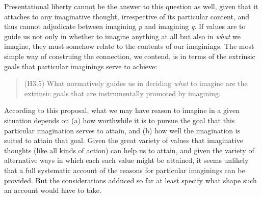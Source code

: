 \noindent Presentational liberty cannot be the answer to this question as well, given that it attaches to any imaginative thought, irrespective of its particular content, and thus cannot adjudicate between imagining \emph{p} and imagining \emph{q}. If values are to guide us not only in whether to imagine anything at all but also in \emph{what} we imagine, they must somehow relate to the contents of our imaginings. The most simple way of construing the connection, we contend, is in terms of the extrinsic goals that particular imaginings serve to achieve:

\vspace{-.2cm}
\begin{quote}
(H3.5) What normatively guides us in deciding \emph{what} to imagine are the extrinsic goals that are instrumentally promoted by imagining.
\end{quote}
\vspace{-.2cm}

\noindent According to this proposal, what we may have reason to imagine in a given situation depends on (a) how worthwhile it is to pursue the goal that this particular imagination serves to attain, and (b) how well the imagination is suited to attain that goal. Given the great variety of values that imaginative thoughts (like all kinds of action) can help us to attain, and given the variety of alternative ways in which each such value might be attained, it seems unlikely that a full systematic account of the reasons for particular imaginings can be provided. But the considerations adduced so far at least specify what shape such an account would have to take.




